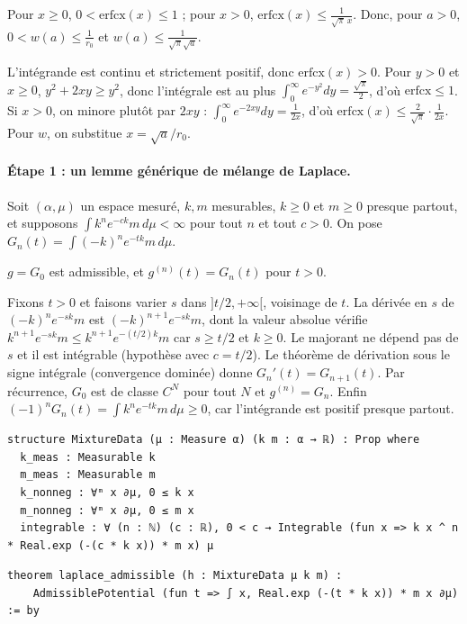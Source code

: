 \begin{lemma}\label{ch2:lem:w}
Pour $x\ge0$, $0<\mathrm{erfcx}(x)\le1$ ; pour $x>0$, $\mathrm{erfcx}(x)\le\frac1{\sqrt\pi\,x}$. Donc, pour $a>0$,
$0<w(a)\le\frac1{r_0}$ et $w(a)\le\frac1{\sqrt\pi\sqrt a}$.
\end{lemma}
\begin{humanproof}
L'intégrande est continu et strictement positif, donc $\mathrm{erfcx}(x)>0$. Pour $y>0$ et $x\ge0$,
$y^2+2xy\ge y^2$, donc l'intégrale est au plus $\int_0^\infty e^{-y^2}dy=\frac{\sqrt\pi}2$, d'où $\mathrm{erfcx}\le1$. Si
$x>0$, on minore plutôt par $2xy$ : $\int_0^\infty e^{-2xy}dy=\frac1{2x}$, d'où
$\mathrm{erfcx}(x)\le\frac2{\sqrt\pi}\cdot\frac1{2x}$. Pour $w$, on substitue $x=\sqrt a/r_0$.
\end{humanproof}

\paragraph{Étape 1 : un lemme générique de mélange de Laplace.} Soit $(\alpha,\mu)$ un espace mesuré, $k,m$ mesurables,
$k\ge0$ et $m\ge0$ presque partout, et supposons $\int k^ne^{-ck}m\,d\mu<\infty$ pour tout $n$ et tout $c>0$. On pose
$G_n(t)=\int(-k)^ne^{-tk}m\,d\mu$.
\begin{theorem}\label{ch2:thm:laplace}
$g=G_0$ est admissible, et $g^{(n)}(t)=G_n(t)$ pour $t>0$. \tierA
\end{theorem}
\begin{humanproof}
Fixons $t>0$ et faisons varier $s$ dans $]t/2,+\infty[$, voisinage de $t$. La dérivée en $s$ de $(-k)^ne^{-sk}m$ est
$(-k)^{n+1}e^{-sk}m$, dont la valeur absolue vérifie $k^{n+1}e^{-sk}m\le k^{n+1}e^{-(t/2)k}m$ car $s\ge t/2$ et
$k\ge0$. Le majorant ne dépend pas de $s$ et il est intégrable (hypothèse avec $c=t/2$). Le théorème de dérivation sous
le signe intégrale (convergence dominée) donne $G_n'(t)=G_{n+1}(t)$. Par récurrence, $G_0$ est de classe $C^N$ pour tout
$N$ et $g^{(n)}=G_n$. Enfin $(-1)^nG_n(t)=\int k^ne^{-tk}m\,d\mu\ge0$, car l'intégrande est positif presque partout.
\end{humanproof}
\begin{leanbox}
\begin{lstlisting}[style=chdeux]
structure MixtureData (μ : Measure α) (k m : α → ℝ) : Prop where
  k_meas : Measurable k
  m_meas : Measurable m
  k_nonneg : ∀ᵐ x ∂μ, 0 ≤ k x
  m_nonneg : ∀ᵐ x ∂μ, 0 ≤ m x
  integrable : ∀ (n : ℕ) (c : ℝ), 0 < c → Integrable (fun x => k x ^ n * Real.exp (-(c * k x)) * m x) μ
\end{lstlisting}
\begin{lstlisting}[style=chdeux]
theorem laplace_admissible (h : MixtureData μ k m) :
    AdmissiblePotential (fun t => ∫ x, Real.exp (-(t * k x)) * m x ∂μ) := by
\end{lstlisting}
\end{leanbox}

